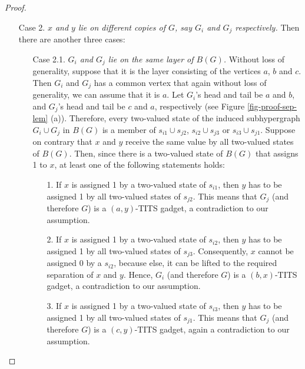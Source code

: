 \documentclass[%
12pt,
prereprint,
showpacs,
showkeys,
preprintnumbers,
amsmath,amssymb,
aps,
pra,
longbibliography,
notitlepage
]{revtex4-1}
\theoremstyle{definition}
\begin{document}
\begin{proof}
\begin{itemize}
                        \item[Case 2.] \emph{$x$ and $y$ lie on different copies of $G$, say $G_i$ and $G_j$ respectively.} Then there are another three cases:
                        \begin{itemize}
                                \item[Case 2.1.] \emph{$G_i$ and $G_j$ lie on the same layer of $B(G)$.} Without loss of generality, suppose that it is the layer consisting of the vertices $a$, $b$ and $c$. Then $G_i$ and $G_j$ has a common vertex that again without loss of generality, we can assume that it is $a$. Let $G_i$'s head and tail be $a$ and $b$, and $G_j$'s head and tail be $c$ and $a$, respectively (see Figure \ref{fig-proof-sep-lem} (a)). Therefore, every two-valued state of the induced subhypergraph $G_i \cup G_j$ in $B(G)$ is a member of $s_{i1} \cup s_{j2}$, $s_{i2} \cup s_{j3}$ or $s_{i3}\cup s_{j1}$. Suppose on contrary that $x$ and $y$ receive the same value by all two-valued states of $B(G)$. Then, since there is a two-valued state of $B(G)$ that assigns 1 to $x$, at least one of the following statements holds:

                                \begin{itemize}
                                        \item[1.] If $x$ is assigned 1 by a two-valued state of $s_{i1}$, then $y$ has to be assigned 1 by all two-valued states of $s_{j2}$. This means that $G_j$ (and therefore $G$) is a $(a,y)$-TITS gadget, a contradiction to our assumption.
                                        \item[2.] If $x$ is assigned 1 by a two-valued state of $s_{i2}$, then $y$ has to be assigned 1 by all two-valued states of $s_{j3}$. Consequently, $x$ cannot be assigned 0 by a $s_{i2}$, because else, it can be lifted to the required separation of $x$ and $y$. Hence, $G_i$ (and therefore $G$) is a $(b,x)$-TITS gadget, a contradiction to our assumption.
                                        \item[3.] If $x$ is assigned 1 by a two-valued state of $s_{i3}$, then $y$ has to be assigned 1 by all two-valued states of $s_{j1}$. This means that $G_j$ (and therefore $G$) is a $(c,y)$-TITS gadget, again a contradiction to our assumption.
                                \end{itemize}



\end{itemize}
\end{itemize}
\end{proof}
\end{document}
